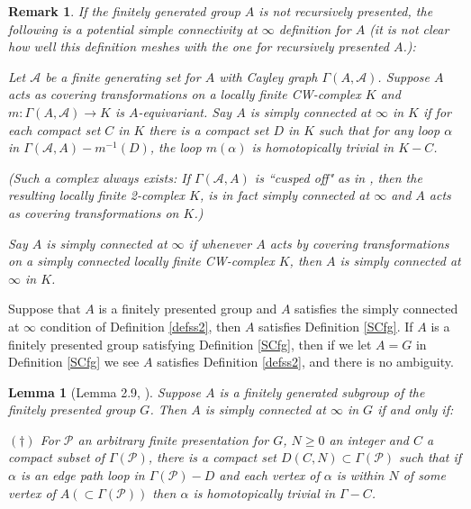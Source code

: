 \documentclass[12pt]{article}
\newtheorem{lemma}[theorem]{Lemma}
\newtheorem{remark}[theorem]{Remark}
\begin{document}
\begin{remark} If the finitely generated group $A$ is not recursively presented, the following is a potential simple connectivity at $\infty$ definition for $A$ (it is not clear how well this definition meshes with the one for recursively presented $A$.):

Let $\mathcal A$ be a finite generating set for $A$ with Cayley graph $\Gamma (A, \mathcal A)$. Suppose $A$ acts as covering transformations on a locally finite CW-complex $K$ and $m:\Gamma(A,\mathcal A)\to K$ is $A$-equivariant. Say $A$ is {\it simply connected at $\infty$ in $K$}  if  for each compact set $C$ in $K$ there is a compact set $D$ in $K$ such that for any loop $\alpha$ in $\Gamma(\mathcal A,A)-m^{-1}(D)$, the loop $m(\alpha)$ is homotopically trivial in $K-C$. 

(Such a complex always exists: If $\Gamma(\mathcal A,A)$ is ``cusped off" as in \cite{GMa08}, then the resulting locally finite 2-complex $K$, is in fact simply connected at $\infty$ and $A$ acts as covering transformations on $K$.)

Say $A$ is {\it simply connected at $\infty$} if whenever $A$ acts by covering transformations on a simply connected locally finite CW-complex $K$, then $A$ is simply connected at $\infty$ in $K$.
\end{remark}

Suppose that $A$ is a finitely presented group and $A$ satisfies the simply connected at $\infty$ condition of Definition \ref{defss2},
then $A$ satisfies Definition \ref{SCfg}. If $A$ is a finitely presented group satisfying Definition \ref{SCfg}, then if we let $A=G$ in Definition \ref{SCfg} we see $A$ satisfies Definition \ref{defss2}, and there is no ambiguity. 

\begin{lemma} [Lemma 2.9, \cite{M6}] \label{equiv} 
Suppose $A$ is a finitely generated subgroup of the finitely presented group $G$. Then $A$ is simply connected at $\infty$ in $G$ if and only if:

\noindent $(\dagger)$ For $\mathcal P$ an arbitrary finite presentation for $G$, $N\geq 0$ an integer and $C$ a compact subset of $\Gamma (\mathcal P)$, there is a compact set $D(C,N)\subset \Gamma (\mathcal P)$ such that if $\alpha$ is an edge path loop in $\Gamma(\mathcal P)-D$ and each vertex of $\alpha$ is within $N$ of some vertex  of $A(\subset \Gamma (\mathcal P))$ then $\alpha$ is homotopically trivial in $\Gamma-C$. 
\end{lemma}
\end{document}
